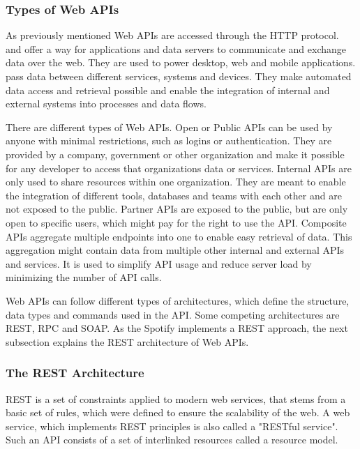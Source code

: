 \subsubsection{Types of Web APIs}

As previously mentioned Web APIs are accessed through the HTTP protocol\cite{StoplightAPITypes}.
and offer a way for applications and data servers to communicate and exchange 
data over the web.\cite{Lane2019WhatIs}
They are used to power desktop, web and mobile applications. pass data between different
services, systems and devices. They make automated data access and retrieval possible
and enable the integration of internal and external systems into processes and data flows.\cite{Lane2019WhatIs}

There are different types of Web APIs.
Open or Public APIs can be used by anyone with minimal restrictions, such as logins or authentication.
They are provided by a company, government or other organization and make it possible for any developer
to access that organizations data or services.\cite{StoplightAPITypes}
Internal APIs are only used to share resources within one organization. They are meant to enable
the integration of different tools, databases and teams with each other and are not exposed to
the public.\cite{StoplightAPITypes}
Partner APIs are exposed to the public, but are only open to specific users, which might pay for
the right to use the API.
Composite APIs aggregate multiple endpoints into one to enable easy retrieval of data.
This aggregation might contain data from multiple other internal and external APIs and services.
It is used to simplify API usage and reduce server load by minimizing the number of API calls.\cite{StoplightAPITypes}

Web APIs can follow different types of architectures, which define the structure, data types
and commands used in the API. Some competing architectures are REST, RPC and SOAP. \cite{StoplightAPITypes}
As the Spotify implements a REST approach\cite{SpotifyWebAPI}, the next subsection explains the REST architecture of
Web APIs.

\subsubsection{The REST Architecture}

\ac{REST} is a set of constraints applied to modern web services, that stems from a basic set
of rules, which were defined to ensure the scalability of the web.\cite[5]{masse2011rest}
A web service, which implements REST principles is also called a "RESTful service".
Such an API consists of a set of interlinked resources called a resource model.\cite[6]{masse2011rest}

